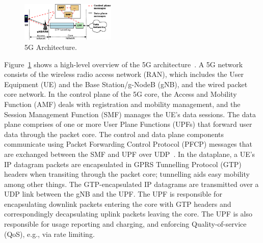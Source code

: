 
\begin{figure}[t]
 \centering
\includegraphics[width=0.4\textwidth]{fig/5g_arch.eps}
\setlength{\belowcaptionskip}{-12pt}
 \caption{5G Architecture.}
 \label{fig:5g_arch}
\end{figure}

 Figure~\ref{fig:5g_arch} shows a high-level overview of the 5G architecture~\cite{5g23501}. A 5G network consists of the wireless radio access network (RAN), which includes the User Equipment (UE) and the Base Station/g-NodeB (gNB), and the wired packet core network. In the control plane of the 5G core, the Access and Mobility Function (AMF) deals with registration and mobility management, and the Session Management Function (SMF) manages the UE's data sessions. The data plane comprises of one or more User Plane Functions (UPFs) that forward user data through the packet core. The control and data plane components communicate using Packet Forwarding Control Protocol (PFCP) messages that are exchanged between the SMF and UPF over UDP~\cite{5g29244}. In the dataplane, a UE's IP datagram packets are encapsulated in GPRS Tunnelling Protocol (GTP) headers when transiting through the packet core; tunnelling aids easy mobility among other things. The GTP-encapsulated IP datagrams are transmitted over a UDP link between the gNB and the UPF. The UPF is responsible for encapsulating downlink packets entering the core with GTP headers and correspondingly decapsulating uplink packets leaving the core. The UPF is also responsible for usage reporting and charging, and enforcing Quality-of-service (QoS), e.g., via rate limiting. 

